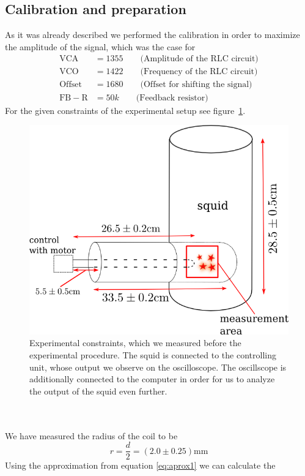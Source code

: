 \subsection{Calibration and preparation}
As it was already described we performed the calibration in order to maximize the amplitude of the
signal, which was the case for \\
\begin{align*}
     \mathrm{VCA} &= 1355 \qquad \text{(Amplitude of the RLC circuit)}\\
     \mathrm{VCO} &= 1422 \qquad\text{(Frequency of the RLC circuit)}\\ 
     \mathrm{Offset} &= 1680 \qquad\text{(Offset for shifting the signal)}\\
     \mathrm{FB-R} &= 50 k \qquad \text{(Feedback resistor)}
\end{align*}
For the given constraints of the experimental setup see figure~\ref{fig:setup1}.
\begin{figure}[htpb]
    \centering
    \includegraphics[width=0.8\linewidth]{figures/setup1}
    \caption{Experimental constraints, which we measured before the experimental procedure. The squid
    is connected to the controlling unit, whose output we observe on the oscilloscope. The oscillscope
    is additionally connected to the computer in order for us to analyze the output of the squid even further.}
    \label{fig:setup1}
\end{figure}
\\\\
We have measured the radius of the coil to be 
\begin{equation}
r = \frac{d}{2} = (2.0 \pm 0.25) \mathrm{mm}
\end{equation}
Using the approximation from equation \eqref{eq:aprox1} we can calculate the
